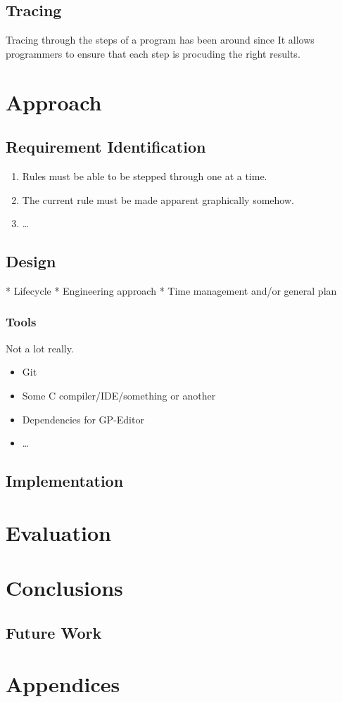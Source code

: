 \documentclass{UoYCSproject}
\begin{document}
\section{Tracing}
Tracing through the steps of a program has been around since %
It allows programmers to ensure that each step is procuding the right results.









\chapter{Approach}
\section{Requirement Identification}
\begin{enumerate}
	\item Rules must be able to be stepped through one at a time.
 	\item The current rule must be made apparent graphically somehow.
	\item \ldots
\end{enumerate}
\section{Design}
 * Lifecycle
 * Engineering approach
 * Time management and/or general plan
 
\subsection{Tools}
Not a lot really.
\begin{itemize}
  \item Git
  \item Some C compiler/IDE/something or another
  \item Dependencies for GP-Editor
  \item \ldots
\end{itemize}
\section{Implementation}

\chapter{Evaluation}
\chapter{Conclusions}
\section{Future Work}

% 

\chapter{Appendices}
\end{document}
